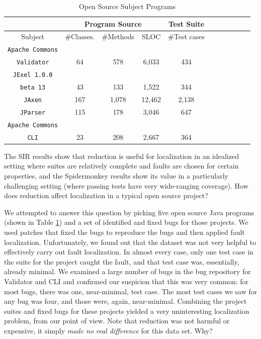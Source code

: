 


\begin{table}
{\scriptsize
\begin{center}
\begin{tabular}{|c||c|c|c|c|c||c|c|c|c|c|}
\hline
\hline
& \multicolumn{3}{|c|}{Program Source} & \multicolumn{1}{|c|}{Test Suite} \\
\hline
Subject & \#Classes. & \#Methods & SLOC & \#Test cases \\
\hline
\hline
{\tt Apache Commons} & & & & \\
{\tt Validator} & 64 & 578 & 6,033 & 434 \\
\hline
{\tt JExel 1.0.0} & & & & \\
{\tt beta 13} & 43 & 133 & 1,522	 & 344  \\
\hline
{\tt JAxen} & 167 & 1,078 & 12,462 & 2,138\\
\hline
{\tt JParser} & 115 & 178 & 3,046 & 647 \\
\hline
{\tt Apache Commons} & & & & \\
{\tt CLI} & 23 & 208 & 2,667 & 364 \\ 
\hline
\hline
\end{tabular}
\end{center}
}
\caption{Open Source Subject Programs}
\label{tab:opensourcesubs}
\end{table}



The SIR results show that reduction is useful for localization in an
idealized setting where suites are relatively complete and faults are
chosen for certain properties, and the Spidermonkey results show its
value in a particularly challenging setting (where passing tests have
very wide-ranging coverage).  How does reduction affect localization
in a typical open source project?

We attempted to answer this question by picking five open source Java
programs (shown in Table \ref{tab:opensourcesubs}) and a set of
identified and fixed bugs for those projects. We used patches that fixed the bugs to reproduce the bugs and then applied fault localization. Unfortunately, we found out that the dataset was not very helpful to effectively carry out fault localization.  In almost every case, only one test
case in the suite for the project caught the fault, and that test case
was, essentially, already minimal.  We examined a large number of bugs
in the bug repository for Validator and CLI and confirmed our
suspicion that this was very common: for most bugs, there was one,
near-minimal, test case.  The most test cases we saw for any bug was
four, and those were, again, near-minimal. Combining the project
suites and fixed bugs for these projects yielded a very uninteresting
localization problem, from our point of view.  Note that reduction was
not harmful or expensive, it simply \emph{made no real difference} for
this data set.  Why?

